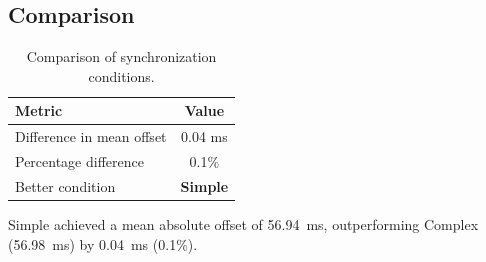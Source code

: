 \subsection*{Comparison}

\begin{table}[h!]
\centering
\begin{tabular}{|l|c|}
\hline
Metric & Value \\
\hline
Difference in mean offset & 0.04 ms \\
Percentage difference & 0.1\% \\
Better condition & \textbf{Simple} \\
\hline
\end{tabular}
\caption{Comparison of synchronization conditions.}
\label{tab:sync_comparison}
\end{table}

Simple achieved a mean absolute offset of 56.94~ms, outperforming Complex (56.98~ms) by 0.04~ms (0.1\%).
